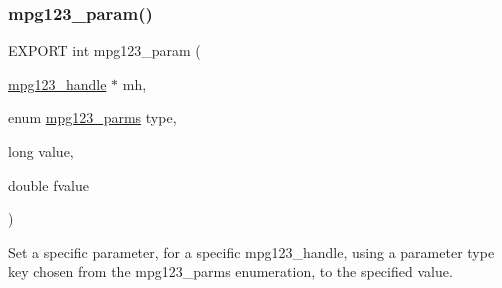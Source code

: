 \subsubsection{\texorpdfstring{mpg123\+\_\+param()}{mpg123\_param()}}
{\footnotesize\ttfamily E\+X\+P\+O\+RT int mpg123\+\_\+param (\begin{DoxyParamCaption}\item[{\hyperlink{group__mpg123__init_ga6728e2839a395f3a07d4514da659faca}{mpg123\+\_\+handle} $\ast$}]{mh,  }\item[{enum \hyperlink{group__mpg123__init_ga73a8ff3363028b89afc72b3ea032b9cb}{mpg123\+\_\+parms}}]{type,  }\item[{long}]{value,  }\item[{double}]{fvalue }\end{DoxyParamCaption})}

Set a specific parameter, for a specific mpg123\+\_\+handle, using a parameter type key chosen from the mpg123\+\_\+parms enumeration, to the specified value. 
